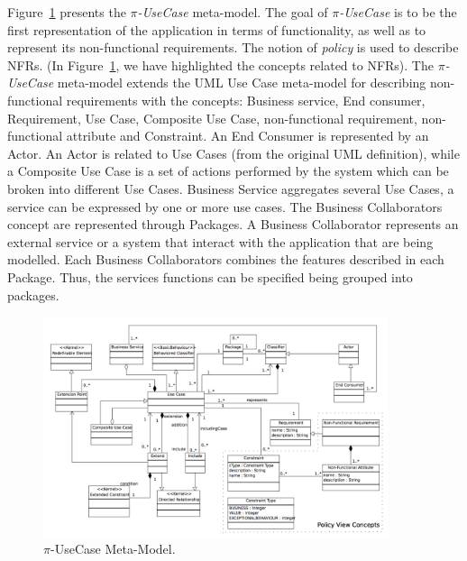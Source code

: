 Figure~\ref{fig:CIM:usecasemetamodel} presents the \textit{$\pi$-UseCase} meta-model.
The goal of \textit{$\pi$-UseCase}  is to be the first representation of the application in terms of functionality, as well as to represent its non-functional requirements.
The notion of \textit{policy} is used to describe NFRs. 
(In Figure~\ref{fig:CIM:usecasemetamodel}, we have highlighted the concepts related to NFRs).
The \textit{$\pi$-UseCase} meta-model extends the UML Use Case meta-model for describing non-functional requirements with  the concepts:  {\sc Business service}, {\sc End consumer}, {\sc Requirement}, {\sc Use Case}, {\sc Composite Use Case}, {\sc non-functional requirement}, {\sc non-functional attribute} and {\sc Constraint}. An {\sc End Consumer} is represented by an {\sc Actor}. An  {\sc Actor} is related to {\sc Use Cases} (from the original UML definition), while a {\sc  Composite Use Case} is a set of actions performed by the system which can be broken into different {\sc Use Cases}.
{\sc  Business Service} aggregates several {\sc Use Cases},  a service can be expressed by one or more use cases.
 The {\sc Business Collaborators} concept are represented  through {\sc Packages}. A {\sc Business Collaborator} represents an external service or a system that interact with the application that are being modelled. Each {\sc Business Collaborators} combines the features described in each  {\sc Package}. Thus, the services functions can be
specified being grouped into packages.
 
 \begin{figure}[htpb]
\center
\includegraphics[width=0.9\textwidth]{figs/UseCaseMetaModel.pdf}
\caption{\label{fig:CIM:usecasemetamodel} $\pi$-UseCase Meta-Model.}
\end{figure}


